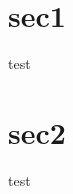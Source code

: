 \documentclass{beamer}
\begin{document}
    \section{sec1}

    \begin{frame}
        test
    \end{frame}

    \section{sec2}

    \begin{frame}
        test
    \end{frame}
\end{document}
